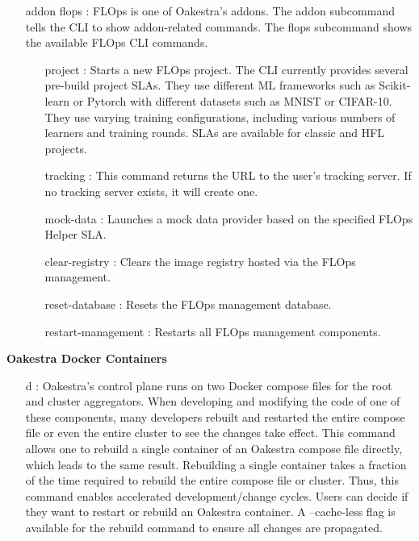 \begin{itemize}
    \item [addon flops]:
        FLOps is one of Oakestra's addons.
        The addon subcommand tells the CLI to show addon-related commands.
        The flops subcommand shows the available FLOps CLI commands.
        \begin{itemize}
            \item [project]:
                Starts a new FLOps project.
                The CLI currently provides several pre-build project SLAs.
                They use different ML frameworks such as Scikit-learn or Pytorch with different datasets such as MNIST or CIFAR-10.
                They use varying training configurations, including various numbers of learners and training rounds.
                SLAs are available for classic and HFL projects.
            \item [tracking]:
                This command returns the URL to the user's tracking server.
                If no tracking server exists, it will create one.
            \item [mock-data]:
                Launches a mock data provider based on the specified FLOps Helper SLA.
            \item [clear-registry]:
                Clears the image registry hosted via the FLOps management.
            \item [reset-database]:
                Resets the FLOps management database.
            \item [restart-management]:
                Restarts all FLOps management components.
        \end{itemize}
\end{itemize}
\vspace{5mm}
\textbf{Oakestra Docker Containers}
\begin{itemize}
    \item [d]:
        Oakestra's control plane runs on two Docker compose files for the root and cluster aggregators.
        When developing and modifying the code of one of these components, many developers rebuilt and restarted the entire compose file or even the entire cluster to see the changes take effect.
        This command allows one to rebuild a single container of an Oakestra compose file directly, which leads to the same result.
        Rebuilding a single container takes a fraction of the time required to rebuild the entire compose file or cluster.
        Thus, this command enables accelerated development/change cycles.
        Users can decide if they want to restart or rebuild an Oakestra container.
        A --cache-less flag is available for the rebuild command to ensure all changes are propagated.
\end{itemize}
